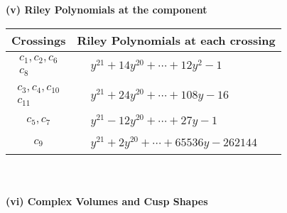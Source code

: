 \documentclass[1p]{elsarticle_modified}
\theoremstyle{definition}
\begin{document}
\newpage\renewcommand{\arraystretch}{1}
\flushleft \textbf{(v) Riley Polynomials at the component}\newline \\
\begin{tabular}{m{50pt}|m{274pt}}
Crossings & \hspace{64pt}Riley Polynomials at each crossing \\
\hline $$\begin{aligned}c_{1},c_{2},c_{6}\\c_{8}\end{aligned}$$&$\begin{aligned}
&y^{21}+14 y^{20}+\cdots+12 y^2-1
\end{aligned}$\\
\hline $$\begin{aligned}c_{3},c_{4},c_{10}\\c_{11}\end{aligned}$$&$\begin{aligned}
&y^{21}+24 y^{20}+\cdots+108 y-16
\end{aligned}$\\
\hline $$\begin{aligned}c_{5},c_{7}\end{aligned}$$&$\begin{aligned}
&y^{21}-12 y^{20}+\cdots+27 y-1
\end{aligned}$\\
\hline $$\begin{aligned}c_{9}\end{aligned}$$&$\begin{aligned}
&y^{21}+2 y^{20}+\cdots+65536 y-262144
\end{aligned}$\\
\hline
\end{tabular}\\~\\
\newpage\flushleft \textbf{(vi) Complex Volumes and Cusp Shapes}
\end{document}

